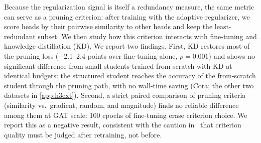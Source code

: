 \documentclass{ws-ijprai}
\begin{document}
Because the regularization signal is itself a redundancy measure, the same
metric can serve as a pruning criterion: after training with the adaptive
regularizer, we score heads by their pairwise similarity to other heads and
keep the least-redundant subset. We then study how this criterion interacts
with fine-tuning and knowledge distillation (KD). We report two findings. First,
KD restores most of the pruning loss (+2.1--2.4 points over fine-tuning alone,
$p=0.001$) and shows no significant difference from small students trained
from scratch with KD at identical budgets: the structured student reaches
the accuracy of the from-scratch student through the pruning path, with no
wall-time saving (Cora; the other two datasets in
\ref{app:h3ext}). Second, a strict paired
comparison of pruning criteria (similarity vs.\ gradient, random, and
magnitude) finds no reliable difference among them at GAT scale: 100 epochs of
fine-tuning erase criterion choice. We report this as a negative result,
consistent with the caution in~\cite{michel2019} that criterion quality must be
judged after retraining, not before.
\end{document}
